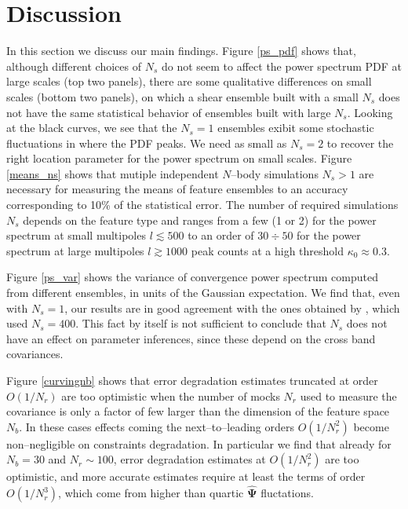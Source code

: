 \documentclass[reprint,aps,prd,superscriptaddress,showkeys,showpacs]{revtex4-1}
\newcommand{\bbh}[1]{\mathbf{\hat{#1}}}
\begin{document}

\section{Discussion}

In this section we discuss our main findings. Figure \ref{ps_pdf} shows that, although different choices of $N_s$ do not seem to affect the power spectrum PDF at large scales (top two panels), there are some qualitative differences on small scales (bottom two panels), on which a shear ensemble built with a small $N_s$ does not have the same statistical behavior of ensembles built with large $N_s$. Looking at the black curves, we see that the $N_s=1$ ensembles exibit some stochastic fluctuations in where the PDF peaks. We need as small as $N_s=2$ to recover the right location parameter for the power spectrum on small scales. Figure \ref{means_ns} shows that mutiple independent $N$--body simulations $N_s>1$ are necessary for measuring the means of feature ensembles to an accuracy corresponding to 10\% of the statistical error. The number of required simulations $N_s$ depends on the feature type and ranges from a few (1 or 2) for the power spectrum at small multipoles $l\lesssim 500$ to an order of $30\div50$ for the power spectrum at large multipoles $l\gtrsim1000$ peak counts at a high threshold $\kappa_0\approx0.3$.   

Figure \ref{ps_var} shows the variance of convergence power spectrum computed from different ensembles, in units of the Gaussian expectation. We find that, even with $N_s=1$, our results are in good agreement with the ones obtained by \citep{Sato12}, which used $N_s=400$. This fact by itself is not sufficient to conclude that $N_s$ does not have an effect on parameter inferences, since these depend on the cross band covariances.

Figure \ref{curvingnb} shows that error degradation estimates truncated at order $O(1/N_r)$ are too optimistic when the number of mocks $N_r$ used to measure the covariance is only a factor of few larger than the dimension of the feature space $N_b$. In these cases effects coming the next--to--leading orders $O(1/N_r^2)$ become non--negligible on constraints degradation. In particular we find that already for $N_b=30$ and $N_r\sim100$, error degradation estimates at $O(1/N_r^2)$ are too optimistic, and more accurate estimates require at least the terms of order $O(1/N_r^3)$, which come from higher than quartic $\bbh{\Psi}$ fluctations.      
\end{document}
